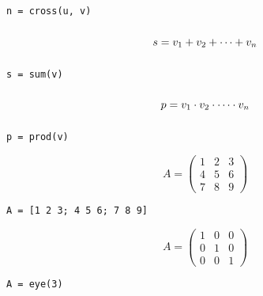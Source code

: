 \documentclass
[
  fontsize = 11pt,
  parskip  = half-,
  BCOR     = 0pt,
  DIV      = 11,
  ngerman
]
{scrartcl}
\begin{document}
\hfill
\begin{minipage}{\cw}
\begin{verbatim}
n = cross(u, v)
\end{verbatim}
\end{minipage}
\begin{minipage}{\mw}
  \begin{equation*}
    \vphantom{\bigg(}%
    s=v_1+v_2+\cdots+v_n
  \end{equation*}
\end{minipage}%
\hfill
\begin{minipage}{\cw}
\begin{verbatim}
s = sum(v)
\end{verbatim}
\end{minipage}
\begin{minipage}{\mw}
  \begin{equation*}
    \vphantom{\bigg(}%
    p=v_1\cdot v_2\cdot\cdots\cdot v_n
  \end{equation*}
\end{minipage}%
\hfill
\begin{minipage}{\cw}
\begin{verbatim}
p = prod(v)
\end{verbatim}
\end{minipage}

\begin{minipage}{\mw}
  \begin{equation*}
    A=\begin{pmatrix}
        1 & 2 & 3 \\
        4 & 5 & 6 \\
        7 & 8 & 9
      \end{pmatrix}
  \end{equation*}
\end{minipage}%
\hfill
\begin{minipage}{\cw}
\begin{verbatim}
A = [1 2 3; 4 5 6; 7 8 9]
\end{verbatim}
\end{minipage}\bigskip

\begin{minipage}{\mw}
  \begin{equation*}
    A=\begin{pmatrix}
        1 & 0 & 0 \\
        0 & 1 & 0 \\
        0 & 0 & 1
    \end{pmatrix}
  \end{equation*}
\end{minipage}%
\hfill
\begin{minipage}{\cw}
\begin{verbatim}
A = eye(3)
\end{verbatim}
\end{minipage}\bigskip
\end{document}
